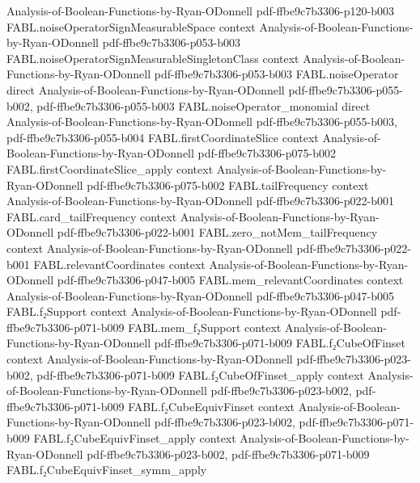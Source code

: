 \begin{theorem}
  {Analysis-of-Boolean-Functions-by-Ryan-ODonnell}
  {pdf-ffbe9c7b3306-p120-b003}
\proofstep
  {FABL.noiseOperatorSignMeasurableSpace}
  {context}
  {Analysis-of-Boolean-Functions-by-Ryan-ODonnell}
  {pdf-ffbe9c7b3306-p053-b003}
\proofstep
  {FABL.noiseOperatorSignMeasurableSingletonClass}
  {context}
  {Analysis-of-Boolean-Functions-by-Ryan-ODonnell}
  {pdf-ffbe9c7b3306-p053-b003}
\proofstep
  {FABL.noiseOperator}
  {direct}
  {Analysis-of-Boolean-Functions-by-Ryan-ODonnell}
  {pdf-ffbe9c7b3306-p055-b002,
    pdf-ffbe9c7b3306-p055-b003}
\proofstep
  {FABL.noiseOperator_monomial}
  {direct}
  {Analysis-of-Boolean-Functions-by-Ryan-ODonnell}
  {pdf-ffbe9c7b3306-p055-b003,
    pdf-ffbe9c7b3306-p055-b004}
\proofstep
  {FABL.firstCoordinateSlice}
  {context}
  {Analysis-of-Boolean-Functions-by-Ryan-ODonnell}
  {pdf-ffbe9c7b3306-p075-b002}
\proofstep
  {FABL.firstCoordinateSlice_apply}
  {context}
  {Analysis-of-Boolean-Functions-by-Ryan-ODonnell}
  {pdf-ffbe9c7b3306-p075-b002}
\proofstep
  {FABL.tailFrequency}
  {context}
  {Analysis-of-Boolean-Functions-by-Ryan-ODonnell}
  {pdf-ffbe9c7b3306-p022-b001}
\proofstep
  {FABL.card_tailFrequency}
  {context}
  {Analysis-of-Boolean-Functions-by-Ryan-ODonnell}
  {pdf-ffbe9c7b3306-p022-b001}
\proofstep
  {FABL.zero_notMem_tailFrequency}
  {context}
  {Analysis-of-Boolean-Functions-by-Ryan-ODonnell}
  {pdf-ffbe9c7b3306-p022-b001}
\proofstep
  {FABL.relevantCoordinates}
  {context}
  {Analysis-of-Boolean-Functions-by-Ryan-ODonnell}
  {pdf-ffbe9c7b3306-p047-b005}
\proofstep
  {FABL.mem_relevantCoordinates}
  {context}
  {Analysis-of-Boolean-Functions-by-Ryan-ODonnell}
  {pdf-ffbe9c7b3306-p047-b005}
\proofstep
  {FABL.f₂Support}
  {context}
  {Analysis-of-Boolean-Functions-by-Ryan-ODonnell}
  {pdf-ffbe9c7b3306-p071-b009}
\proofstep
  {FABL.mem_f₂Support}
  {context}
  {Analysis-of-Boolean-Functions-by-Ryan-ODonnell}
  {pdf-ffbe9c7b3306-p071-b009}
\proofstep
  {FABL.f₂CubeOfFinset}
  {context}
  {Analysis-of-Boolean-Functions-by-Ryan-ODonnell}
  {pdf-ffbe9c7b3306-p023-b002,
    pdf-ffbe9c7b3306-p071-b009}
\proofstep
  {FABL.f₂CubeOfFinset_apply}
  {context}
  {Analysis-of-Boolean-Functions-by-Ryan-ODonnell}
  {pdf-ffbe9c7b3306-p023-b002,
    pdf-ffbe9c7b3306-p071-b009}
\proofstep
  {FABL.f₂CubeEquivFinset}
  {context}
  {Analysis-of-Boolean-Functions-by-Ryan-ODonnell}
  {pdf-ffbe9c7b3306-p023-b002,
    pdf-ffbe9c7b3306-p071-b009}
\proofstep
  {FABL.f₂CubeEquivFinset_apply}
  {context}
  {Analysis-of-Boolean-Functions-by-Ryan-ODonnell}
  {pdf-ffbe9c7b3306-p023-b002,
    pdf-ffbe9c7b3306-p071-b009}
\proofstep
  {FABL.f₂CubeEquivFinset_symm_apply}

\end{theorem}

